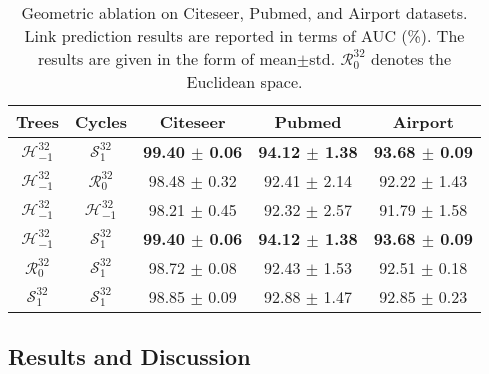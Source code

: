 \begin{table}[t]
\centering %
\caption{Geometric ablation on Citeseer, Pubmed, and Airport datasets. Link prediction results are reported in terms of AUC (\%). The results are given in the form of mean$\pm$std. $\mathcal R^{32}_{0}$ denotes the Euclidean space.}
       \vspace{-0.1in}
\label{tab:geo-ablation}
\begin{tabular}{cc|c c c}
\hline
\textbf{Trees} & \textbf{Cycles} & \textbf{Citeseer} & \textbf{Pubmed} & \textbf{Airport} \\
\hline
$\mathcal H^{32}_{-1}$ & $\mathcal S^{32}_{1}$ & \textbf{99.40 $\pm$ 0.06} & \textbf{94.12 $\pm$ 1.38} & \textbf{93.68 $\pm$ 0.09} \\
$\mathcal H^{32}_{-1}$ & $\mathcal R^{32}_{0}$ & 98.48 $\pm$ 0.32 & 92.41 $\pm$ 2.14 & 92.22 $\pm$ 1.43 \\
$\mathcal H^{32}_{-1}$ & $\mathcal H^{32}_{-1}$ & 98.21 $\pm$ 0.45 & 92.32 $\pm$ 2.57 & 91.79 $\pm$ 1.58 \\
\hline
$\mathcal H^{32}_{-1}$ & $\mathcal S^{32}_{1}$ & \textbf{99.40 $\pm$ 0.06} & \textbf{94.12 $\pm$ 1.38} & \textbf{93.68 $\pm$ 0.09} \\
$\mathcal R^{32}_{0}$ & $\mathcal S^{32}_{1}$ & 98.72 $\pm$ 0.08 & 92.43 $\pm$ 1.53 & 92.51 $\pm$ 0.18 \\
$\mathcal S^{32}_{1}$ & $\mathcal S^{32}_{1}$ & 98.85 $\pm$ 0.09 & 92.88 $\pm$ 1.47 & 92.85 $\pm$ 0.23 \\
\hline
\end{tabular}
       \vspace{-0.2in}
\end{table}

\vspace{-0.12in}
\subsection{Results and Discussion}
\vspace{-0.01in}
